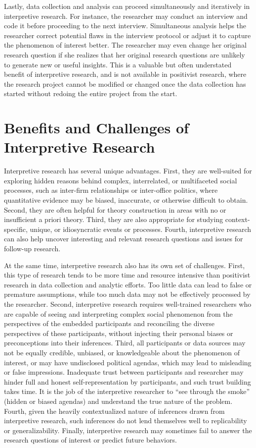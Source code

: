 Lastly, data collection and analysis can proceed simultaneously and iteratively in interpretive research. For instance, the researcher may conduct an interview and code it before proceeding to the next interview. Simultaneous analysis helps the researcher correct potential flaws in the interview protocol or adjust it to capture the phenomenon of interest better. The researcher may even change her original research question if she realizes that her original research questions are unlikely to generate new or useful insights. This is a valuable but often understated benefit of interpretive research, and is not available in positivist research, where the research project cannot be modified or changed once the data collection has started without redoing the entire project from the start.

\section{Benefits and Challenges of Interpretive Research}

Interpretive research has several unique advantages. First, they are well-suited for exploring hidden reasons behind complex, interrelated, or multifaceted social processes, such as inter-firm relationships or inter-office politics, where quantitative evidence may be biased, inaccurate, or otherwise difficult to obtain. Second, they are often helpful for theory construction in areas with no or insufficient a priori theory. Third, they are also appropriate for studying context-specific, unique, or idiosyncratic events or processes. Fourth, interpretive research can also help uncover interesting and relevant research questions and issues for follow-up research.

At the same time, interpretive research also has its own set of challenges. First, this type of research tends to be more time and resource intensive than positivist research in data collection and analytic efforts. Too little data can lead to false or premature assumptions, while too much data may not be effectively processed by the researcher. Second, interpretive research requires well-trained researchers who are capable of seeing and interpreting complex social phenomenon from the perspectives of the embedded participants and reconciling the diverse perspectives of these participants, without injecting their personal biases or preconceptions into their inferences. Third, all participants or data sources may not be equally credible, unbiased, or knowledgeable about the phenomenon of interest, or may have undisclosed political agendas, which may lead to misleading or false impressions. Inadequate trust between participants and researcher may hinder full and honest self-representation by participants, and such trust building takes time. It is the job of the interpretive researcher to “see through the smoke” (hidden or biased agendas) and understand the true nature of the problem. Fourth, given the heavily contextualized nature of inferences drawn from interpretive research, such inferences do not lend themselves well to replicability or generalizability. Finally, interpretive research may sometimes fail to answer the research questions of interest or predict future behaviors.

